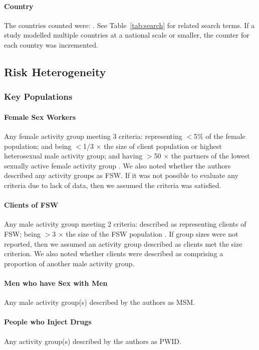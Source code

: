 \paragraph{Country}
The countries counted were: \emph{\countrylist}.
See Table~\ref{tab:search} for related search terms.
If a study modelled multiple countries at a national scale or smaller,
the counter for each country was incremented.
\subsection{Risk Heterogeneity}
\label{aa:defs:risk}
\subsubsection{Key Populations}
\label{aaa:defs:kp}
\paragraph{Female Sex Workers}
Any female activity group meeting 3 criteria:
representing {$<$5\%} of the female population; and
being {$<$1/3 $\times$} the size of client population or highest heterosexual male activity group; and
having {$>$50 $\times$} the partners of the lowest sexually active female activity group
\cite{Vandepitte2006,Carael2006,Scorgie2012}.
We also noted whether the authors described any activity groups as FSW.
If it was not possible to evaluate any criteria due to lack of data,
then we assumed the criteria was satisfied.
\paragraph{Clients of FSW}
Any male activity group meeting 2 criteria:
described as representing clients of FSW;
being {$>$3 $\times$} the size of the FSW population \cite{Carael2006}.
If group sizes were not reported,
then we assumed an activity group described as clients met the size criterion.
We also noted whether clients were described as
comprising a proportion of another male activity group.
\paragraph{Men who have Sex with Men}
Any male activity group(s) described by the authors as MSM.
\paragraph{People who Inject Drugs}
Any activity group(s) described by the authors as PWID.
